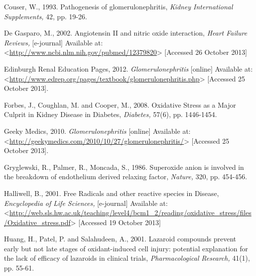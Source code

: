\documentclass[11pt]{report}
\begin{document}
Couser, W., 1993. Pathogenesis of glomerulonephritis, \textit{Kidney International Supplements,} 42, pp. 19-26.
\newline
\newline

De Gasparo, M., 2002. Angiotensin II and nitric oxide interaction, \textit{Heart Failure Reviews,} [e-journal] Available at:<\url{http://www.ncbi.nlm.nih.gov/pubmed/12379820}> [Accessed 26 October 2013]
\newline
\newline

Edinburgh Renal Education Pages, 2012. \textit{Glomerulonephritis} [online] Available at: <\url{http://www.edrep.org/pages/textbook/glomerulonephritis.php}> [Accessed 25 October 2013].
\newline
\newline

Forbes, J., Coughlan, M. and Cooper, M., 2008. Oxidative Stress as a Major Culprit in Kidney Disease in Diabetes, \textit{Diabetes,} 57(6), pp. 1446-1454.
\newline
\newline

Geeky Medics, 2010. \textit{Glomerulonephritis} [online] Available at: <\url{http://geekymedics.com/2010/10/27/glomerulonephritis/}> [Accessed 25 October 2013].
\newline
\newline

Gryglewski, R., Palmer, R., Moncada, S., 1986. Superoxide anion is involved in the break­down of endothelium derived relaxing factor, \textit{Nature,} 320, pp. 454-456.
\newline
\newline

Halliwell, B., 2001. Free Radicals and other reactive species in Disease, \textit{Encyclopedia of Life Sciences,} [e-journal] Available at:<\url{http://web.sls.hw.ac.uk/teaching/level4/bcm1_2/reading/oxidative_stress/files/Oxidative_stress.pdf}> [Accessed 19 October 2013]
\newline
\newline

Huang, H., Patel, P. and Salahudeen, A., 2001. Lazaroid compounds prevent early but not late stages of oxidant-induced cell injury: potential explanation for the lack of efficacy of lazaroids in clinical trials, \textit{Pharmacological Research,} 41(1), pp. 55-61.
\newline
\newline
\end{document}
